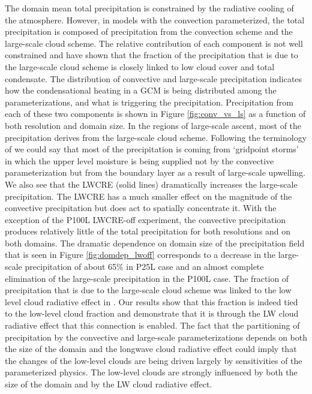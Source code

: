 \documentclass[draft]{agujournal2019}
\begin{document}
{The domain mean total precipitation is constrained by the radiative cooling of the atmosphere.  
However, in models with the convection parameterized, the 
total precipitation is composed of precipitation from the convection scheme and the large-scale cloud scheme. 
The relative contribution of each component is not well constrained and  have shown 
that the fraction of the precipitation that is due to the large-scale cloud scheme is closely linked 
to low cloud cover and total condensate.  
The distribution of convective and large-scale precipitation indicates how the condensational heating
in a GCM is being distributed among the parameterizations, and what is triggering the precipitation.  
Precipitation from each of these two components is shown in Figure \ref{fig:conv_vs_ls} as a function of 
both resolution and domain size.  In the regions of large-scale ascent, most of the precipitation derives 
from the large-scale cloud scheme.  Following the terminology of  we could say that most 
of the precipitation is coming from `gridpoint storms' in which the upper level moisture is being supplied not 
by the convective parameterization but from the boundary layer as a result of large-scale upwelling.
We also see that the LWCRE (solid lines) dramatically increases the large-scale precipitation.  
The LWCRE has a much smaller effect on the magnitude of the convective precipitation but does act to spatially concentrate it.  
With the exception 
of the P100L LWCRE-off experiment, the convective precipitation produces relatively little of the total precipitation for 
both resolutions and on both domains.  The dramatic dependence on domain size of the precipitation field that is 
seen in Figure \ref{fig:domdep_lwoff} corresponds to a decrease in the large-scale precipitation of about 65\% in P25L case
and an almost complete elimination of the large-scale precipitation in the P100L case.    
The fraction of precipitation that is due to the large-scale cloud scheme was linked to the low level cloud radiative
effect in . Our results show that this fraction is indeed tied to the low-level cloud fraction 
and demonstrate that it is through the LW cloud radiative effect that this connection is enabled.
The fact that the partitioning of precipitation by the convective and large-scale 
parameterizations depends on both the size of the domain and the longwave cloud 
radiative effect could imply that the changes of the low-level clouds are being driven largely by 
sensitivities of the parameterized physics.   
The low-level clouds are strongly influenced by both the size of the domain and by the LW cloud 
radiative effect. 


}
\end{document}
